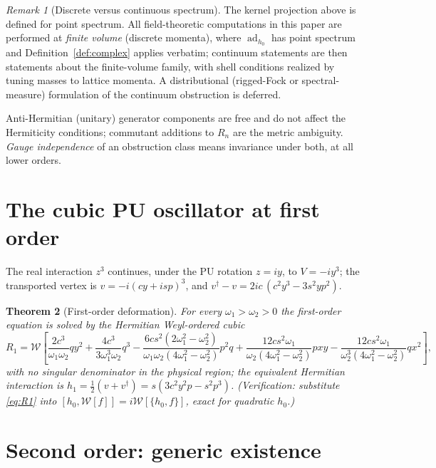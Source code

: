 \documentclass[11pt]{article}
\newtheorem{theorem}{Theorem}[section]
\theoremstyle{definition}
\theoremstyle{remark}
\newtheorem{remark}[theorem]{Remark}
\newcommand{\w}{\omega}
\newcommand{\dg}{\dagger}
\newcommand{\ad}{\operatorname{ad}}
\begin{document}
\begin{remark}[Discrete versus continuous spectrum]\label{rem:volume}
The kernel projection above is defined for point spectrum.  All
field-theoretic computations in this paper are performed at
\emph{finite volume} (discrete momenta), where $\ad_{h_0}$ has point
spectrum and Definition~\ref{def:complex} applies verbatim; continuum
statements are then statements about the finite-volume family, with
shell conditions realized by tuning masses to lattice momenta.  A
distributional (rigged-Fock or spectral-measure) formulation of the
continuum obstruction is deferred.
\end{remark}

Anti-Hermitian (unitary) generator components are free and do not
affect the Hermiticity conditions; commutant additions to $R_n$ are the
metric ambiguity.  \emph{Gauge independence} of an obstruction class
means invariance under both, at all lower orders.

\section{The cubic PU oscillator at first order}\label{sec:first}

The real interaction $z^3$ continues, under the PU rotation $z=iy$, to
$V=-iy^3$; the transported vertex is $v=-i(cy+isp)^3$, and
$v^{\dg}-v=2ic\,(c^2y^3-3s^2yp^2)$.

\begin{theorem}[First-order deformation]\label{thm:first}
For every $\w_1>\w_2>0$ the first-order equation is solved by the
Hermitian Weyl-ordered cubic
\begin{equation}\label{eq:R1}
R_1=\mathcal W\!\left[
\frac{2c^3}{\w_1\w_2}qy^2
+\frac{4c^3}{3\w_1^3\w_2}q^3
-\frac{6cs^2(2\w_1^2-\w_2^2)}{\w_1\w_2(4\w_1^2-\w_2^2)}p^2q
+\frac{12cs^2\w_1}{\w_2(4\w_1^2-\w_2^2)}pxy
-\frac{12cs^2\w_1}{\w_2^3(4\w_1^2-\w_2^2)}qx^2
\right],
\end{equation}
with no singular denominator in the physical region; the equivalent
Hermitian interaction is
$h_1=\tfrac12(v+v^{\dg})=s(3c^2y^2p-s^2p^3)$.  (Verification:
substitute \eqref{eq:R1} into $[h_0,\mathcal W[f]]=i\mathcal
W[\{h_0,f\}]$, exact for quadratic $h_0$.)
\end{theorem}

\section{Second order: generic existence}\label{sec:second}
\end{document}
